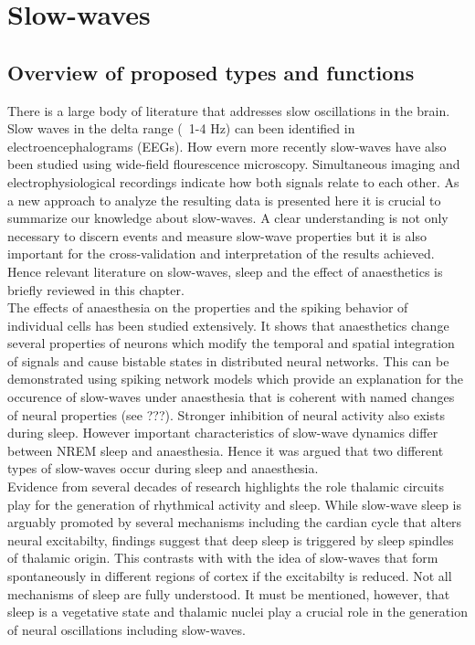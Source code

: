 
\chapter{Slow-waves} %

\label{Chapter2} %


\section{Overview of proposed types and functions}
There is a large body of literature that addresses slow oscillations in the brain. Slow waves in the delta range (~1-4 Hz) can been identified in electroencephalograms (EEGs). How evern more recently slow-waves have also been studied using wide-field flourescence microscopy. Simultaneous imaging and electrophysiological recordings indicate how both signals relate to each other. As a new approach to analyze the resulting data is presented here it is crucial to summarize our knowledge about slow-waves. A clear understanding is not only necessary to discern events and measure slow-wave properties but it is also important for the cross-validation and interpretation of the results achieved. Hence relevant literature on slow-waves, sleep and the effect of anaesthetics is briefly reviewed in this chapter. \\
The effects of anaesthesia on the properties and the spiking behavior of individual cells has been studied extensively. It shows that anaesthetics change several properties of neurons which modify the temporal and spatial integration of signals and cause bistable states in distributed neural networks. This can be demonstrated using spiking network models which provide an explanation for the occurence of slow-waves under anaesthesia that is coherent with named changes of neural properties (see ???). Stronger inhibition of neural activity also exists during sleep. However important characteristics of slow-wave dynamics differ between NREM sleep and anaesthesia. Hence it was argued that two different types of slow-waves occur during sleep and anaesthesia. \\
Evidence from several decades of research highlights the role thalamic circuits play for the generation of rhythmical activity and sleep. While slow-wave sleep is arguably promoted by several mechanisms including the cardian cycle that alters neural excitabilty, findings suggest that deep sleep is triggered by sleep spindles of thalamic origin. This contrasts with with the idea of slow-waves that form spontaneously in different regions of cortex if the excitabilty is reduced. Not all mechanisms of sleep are fully understood. It must be mentioned, however, that sleep is a vegetative state and thalamic nuclei play a crucial role in the generation of neural oscillations including slow-waves.\\
